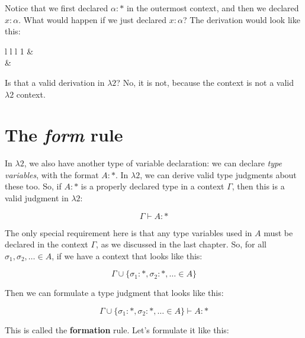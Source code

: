 \documentclass{book}
\numberwithin{equation}{chapter}
\newcommand{\vocab}{\textbf}
\newenvironment{typederivation}
  {\begin{tabular}[t]{l l l}}
  {\end{tabular}}
\newcommand{\tdcontext}[2]
  {
    &
    \multicolumn{2}{l}{
    \begin{tabular}[t]{| l l l}
    \multicolumn{3}{| l}{#1} \\\cline{1-2}
    & & \\
    #2
    \end{tabular}
    } \\ & \\
  }
\newcommand{\tdnum}[1]{#1}
\newcommand{\tdjudge}[1]{& #1}
\newcommand{\tdjustify}[1]{& #1 \\}
\begin{document}
\noindent
Notice that we first declared $\alpha : *$ in the outermost context, and then we declared $x : \alpha$. What would happen if we just declared $x : \alpha$? The derivation would look like this:

\begin{center}
\begin{typederivation}
\tdnum{1} \tdcontext{$x : \alpha$}{
    \tdnum{2} \tdjudge{$x : \alpha$} \tdjustify{\textit{var}, 1}
}
\end{typederivation}
\end{center}

\noindent
Is that a valid derivation in $\lambda 2$? No, it is not, because the context is not a valid $\lambda 2$ context.


\section{The \textit{form} rule}

In $\lambda 2$, we also have another type of variable declaration: we can declare \textit{type variables}, with the format $A : *$. In $\lambda 2$, we can derive valid type judgments about these too. So, if $A : *$ is a properly declared type in a context $\Gamma$, then this is a valid judgment in $\lambda 2$:

\begin{equation}
\Gamma \vdash A : *
\end{equation}

\noindent
The only special requirement here is that any type variables used in $A$ must be declared in the context $\Gamma$, as we discussed in the last chapter. So, for all $\sigma_{1}, \sigma_{2}, \ldots \in A$, if we have a context that looks like this:

\begin{equation}
\Gamma \cup \{ \sigma_{1} : *, \sigma_{2} : *, \ldots \in A \}
\end{equation}

\noindent
Then we can formulate a type judgment that looks like this:

\begin{equation}
\Gamma \cup \{ \sigma_{1} : *, \sigma_{2} : *, \ldots \in A \} \vdash A : *
\end{equation}

\noindent
This is called the \vocab{formation} rule. Let's formulate it like this:
\end{document}

